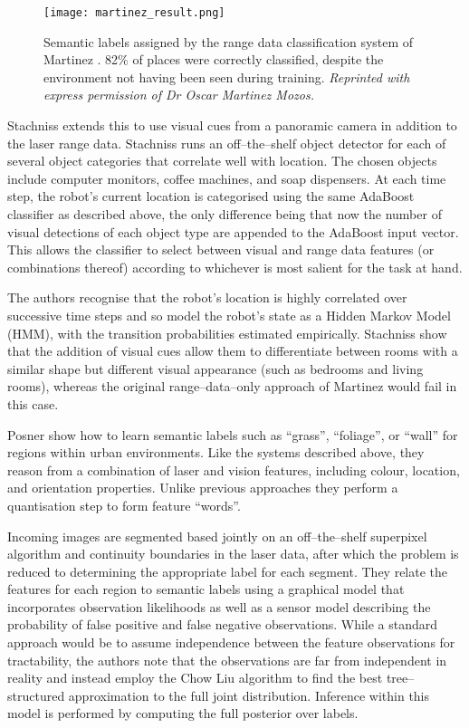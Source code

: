\begin{figure}[tb]
  \centering
  \texttt{[image: martinez\_result.png]}
  \caption{Semantic labels assigned by the range data classification
    system of Martinez \etal \cite{Mozos05}. 82\% of places were
    correctly classified, despite the environment not having been seen
    during training.
    \textit{Reprinted with express permission of Dr Oscar Martinez Mozos.}
    }
  \label{fig:martinez-result}
\end{figure}

Stachniss \etal \cite{Stachniss05} extends this to use visual cues
from a panoramic camera in addition to the laser range data. Stachniss
runs an off--the--shelf object detector for each of several object
categories that correlate well with location. The chosen objects
include computer monitors, coffee machines, and soap dispensers. At
each time step, the robot's current location is categorised using the
same AdaBoost classifier as described above, the only difference being
that now the number of visual detections of each object type are
appended to the AdaBoost input vector. This allows the classifier to
select between visual and range data features (or combinations
thereof) according to whichever is most salient for the task at hand.

The authors recognise that the robot's location is highly correlated
over successive time steps and so model the robot's state as a Hidden
Markov Model (HMM), with the transition probabilities estimated
empirically. Stachniss \etal show that the addition of visual cues
allow them to differentiate between rooms with a similar shape but
different visual appearance (such as bedrooms and living rooms),
whereas the original range--data--only approach of Martinez would fail
in this case.

Posner \etal \cite{Posner08} show how to learn semantic labels such as
``grass'', ``foliage'', or ``wall'' for regions within urban
environments. Like the systems described above, they reason from a
combination of laser and vision features, including colour, location,
and orientation properties. Unlike previous approaches they perform a
quantisation step to form feature ``words''.

Incoming images are segmented based jointly on an off--the--shelf
superpixel algorithm and continuity boundaries in the laser data,
after which the problem is reduced to determining the appropriate
label for each segment. They relate the features for each region to
semantic labels using a graphical model that incorporates observation
likelihoods as well as a sensor model describing the probability of
false positive and false negative observations. While a standard
approach would be to assume independence between the feature
observations for tractability, the authors note that the observations
are far from independent in reality and instead employ the Chow Liu
algorithm to find the best tree--structured approximation to the full
joint distribution. Inference within this model is performed by
computing the full posterior over labels.


